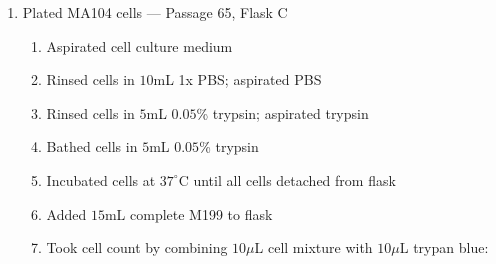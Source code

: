 \begin{enumerate}
	\item Plated MA104 cells --- Passage 65, Flask C
		\begin{enumerate}
			\item Aspirated cell culture medium
			\item Rinsed cells in $10$mL 1x PBS; aspirated PBS
			\item Rinsed cells in $5$mL $0.05$\% trypsin; aspirated trypsin
			\item Bathed cells in $5$mL $0.05$\% trypsin
			\item Incubated cells at $37^{\circ}$C until all cells detached from flask
			\item Added $15$mL complete M199 to flask
			\item Took cell count by combining $10\mu$L cell mixture with $10\mu$L trypan blue:
			

\end{enumerate}
\end{enumerate}
